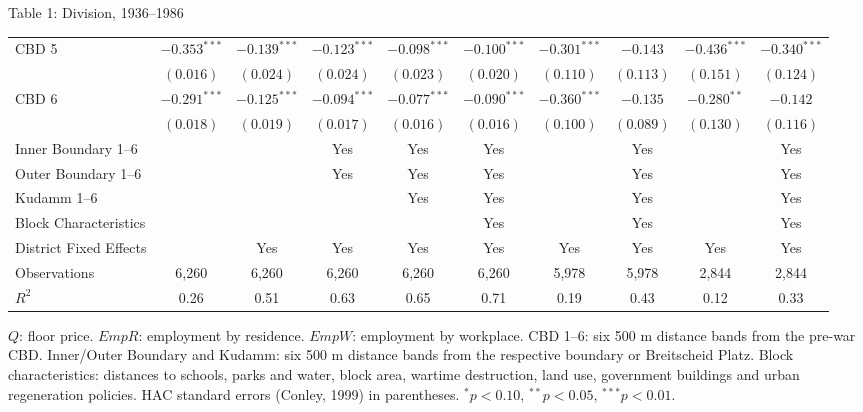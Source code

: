 \documentclass[aspectratio=169,11pt]{beamer}
\begin{document}
\begin{frame}{Table 1: Division, 1936--1986}
{\begin{tabular}{@{}l*{9}{c}@{}}
CBD 5 & $-0.353^{***}$ & $-0.139^{***}$ & $-0.123^{***}$ & $-0.098^{***}$ & $-0.100^{***}$ & $-0.301^{***}$ & $-0.143$ & $-0.436^{***}$ & $-0.340^{***}$ \\
 & $(0.016)$ & $(0.024)$ & $(0.024)$ & $(0.023)$ & $(0.020)$ & $(0.110)$ & $(0.113)$ & $(0.151)$ & $(0.124)$ \\
CBD 6 & $-0.291^{***}$ & $-0.125^{***}$ & $-0.094^{***}$ & $-0.077^{***}$ & $-0.090^{***}$ & $-0.360^{***}$ & $-0.135$ & $-0.280^{**}$ & $-0.142$ \\
 & $(0.018)$ & $(0.019)$ & $(0.017)$ & $(0.016)$ & $(0.016)$ & $(0.100)$ & $(0.089)$ & $(0.130)$ & $(0.116)$ \\
\midrule
Inner Boundary 1--6 &  &  & Yes & Yes & Yes &  & Yes &  & Yes \\
Outer Boundary 1--6 &  &  & Yes & Yes & Yes &  & Yes &  & Yes \\
Kudamm 1--6 &  &  &  & Yes & Yes &  & Yes &  & Yes \\
Block Characteristics &  &  &  &  & Yes &  & Yes &  & Yes \\
District Fixed Effects &  & Yes & Yes & Yes & Yes & Yes & Yes & Yes & Yes \\
Observations & 6,260 & 6,260 & 6,260 & 6,260 & 6,260 & 5,978 & 5,978 & 2,844 & 2,844 \\
$R^2$ & 0.26 & 0.51 & 0.63 & 0.65 & 0.71 & 0.19 & 0.43 & 0.12 & 0.33 \\
\bottomrule
  \end{tabular}}
  \vspace{0.35em}
  \parbox{\textwidth}{\fontsize{5.5}{6.5}\selectfont
  $Q$: floor price. $EmpR$: employment by residence. $EmpW$: employment by workplace.
  CBD 1--6: six 500 m distance bands from the pre-war CBD.
  Inner/Outer Boundary and Kudamm: six 500 m distance bands from the respective boundary or Breitscheid Platz.
  Block characteristics: distances to schools, parks and water, block area, wartime destruction, land use,
  government buildings and urban regeneration policies.
  HAC standard errors (Conley, 1999) in parentheses.
  $^{*}p<0.10$, $^{**}p<0.05$, $^{***}p<0.01$.}
\end{frame}
\end{document}
